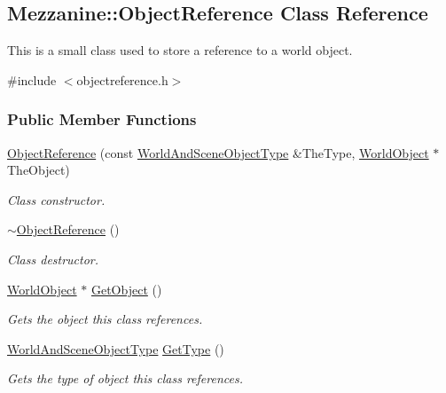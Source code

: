 \hypertarget{classMezzanine_1_1ObjectReference}{
\subsection{Mezzanine::ObjectReference Class Reference}
\label{classMezzanine_1_1ObjectReference}
}


This is a small class used to store a reference to a world object.  




{\ttfamily \#include $<$objectreference.h$>$}

\subsubsection*{Public Member Functions}
\begin{DoxyCompactItemize}
\item 
\hyperlink{classMezzanine_1_1ObjectReference_a44a5d89e7f53c786c50d543996844cd7}{ObjectReference} (const \hyperlink{namespaceMezzanine_ae8cd04f706f4998be62f454b7119c718}{WorldAndSceneObjectType} \&TheType, \hyperlink{classMezzanine_1_1WorldObject}{WorldObject} $\ast$TheObject)
\begin{DoxyCompactList}\small\item\em Class constructor. \item\end{DoxyCompactList}\item 
\hypertarget{classMezzanine_1_1ObjectReference_aabb1fbfa7abe2d333c7946941368d2e3}{
\hyperlink{classMezzanine_1_1ObjectReference_aabb1fbfa7abe2d333c7946941368d2e3}{$\sim$ObjectReference} ()}
\label{classMezzanine_1_1ObjectReference_aabb1fbfa7abe2d333c7946941368d2e3}

\begin{DoxyCompactList}\small\item\em Class destructor. \item\end{DoxyCompactList}\item 
\hyperlink{classMezzanine_1_1WorldObject}{WorldObject} $\ast$ \hyperlink{classMezzanine_1_1ObjectReference_ad0be2b6ed910bbf8d68f2de89af64973}{GetObject} ()
\begin{DoxyCompactList}\small\item\em Gets the object this class references. \item\end{DoxyCompactList}\item 
\hyperlink{namespaceMezzanine_ae8cd04f706f4998be62f454b7119c718}{WorldAndSceneObjectType} \hyperlink{classMezzanine_1_1ObjectReference_adb9563aefcef481a236e50155c155735}{GetType} ()
\begin{DoxyCompactList}\small\item\em Gets the type of object this class references. \item\end{DoxyCompactList}\end{DoxyCompactItemize}
